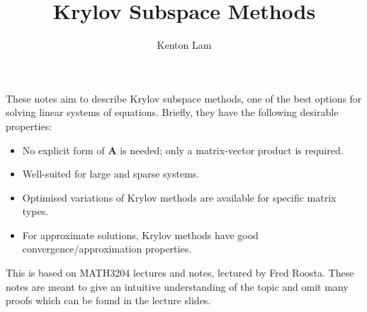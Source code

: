 \documentclass[12pt,a4paper]{article} %
\title{Krylov Subspace Methods}
\author{Kenton Lam}
\begin{document}
\maketitle

These notes aim to describe Krylov subspace methods, 
one of the best options for solving linear systems of equations.
Briefly, they have the following desirable properties:
\begin{itemize}
    \item No explicit form of $\mathbf A$ is needed; only a matrix-vector product is required.
    \item Well-suited for large and sparse systems.
    \item Optimised variations of Krylov methods are available for specific matrix types.
    \item For approximate solutions, Krylov methods have good convergence/approximation properties.
\end{itemize}
This is based on MATH3204 lectures and notes, lectured by Fred Roosta. 
These notes are meant to give an intuitive understanding of the topic and 
omit many proofs which can be found in the lecture slides.
\end{document}
